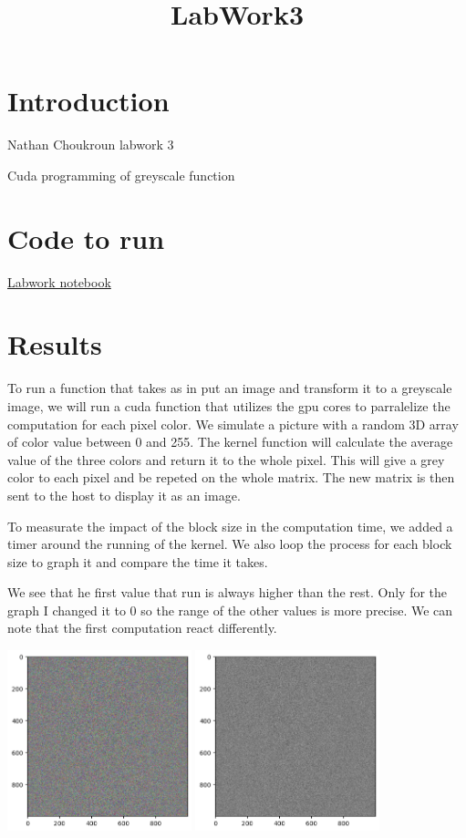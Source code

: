 \documentclass{article}
\begin{document}
\title{LabWork3}
\section{Introduction}

Nathan Choukroun labwork 3

Cuda programming of greyscale function

\section{Code to run}

\href{hpc_lab3_greyscale.ipynb}{Labwork notebook}

\section{Results}

To run a function that takes as in put an image and transform it to a greyscale image, we will run a cuda function that utilizes the gpu cores to parralelize the computation for each pixel color. We simulate a picture with a random 3D array of color value between 0 and 255. The kernel function will calculate the average value of the three colors and return it to the whole pixel. This will give a grey color to each pixel and be repeted on the whole matrix. The new matrix is then sent to the host to display it as an image. 

To measurate the impact of the block size in the computation time, we added a timer around the running of the kernel. We also loop the process for each block size to graph it and compare the time it takes. 

We see that he first value that run is always higher than the rest. Only for the graph I changed it to 0 so the range of the other values is more precise. We can note that the first computation react differently. 

\includegraphics[width=0.4\textwidth]{pixelGridColor.png}
\includegraphics[width=0.4\textwidth]{pixelGrid.png}
\end{document}
